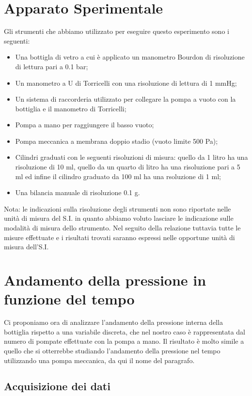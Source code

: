 \section{Apparato Sperimentale}

Gli strumenti che abbiamo utilizzato per eseguire questo esperimento sono i seguenti:
\begin{itemize}
	\item{Una bottigla di vetro a cui è applicato un manometro Bourdon di risoluzione di lettura pari a 0.1 bar;}
	\item{Un manometro a U di Torricelli con una risoluzione di lettura di 1 mmHg;}
	\item{Un sistema di raccorderia utilizzato per collegare la pompa a vuoto con la bottiglia e il manometro di Torricelli;}
	\item{Pompa a mano per raggiungere il basso vuoto;}
	\item{Pompa meccanica a membrana doppio stadio (vuoto limite 500 Pa);}
	\item{Cilindri graduati con le seguenti risoluzioni di misura: quello da 1 litro ha una risoluzione di 10 ml, quello da un quarto di litro ha una risoluzione pari a 5 ml ed infine il cilindro graduato da 100 ml ha una rsoluzione di 1 ml;}
	\item{Una bilancia manuale di risoluzione 0.1 g.}
\end{itemize}
%
Nota: %
le indicazioni sulla risoluzione degli strumenti non sono riportate nelle unità di misura del S.I. %
in quanto abbiamo voluto lasciare le indicazione sulle modalità di misura dello strumento. Nel seguito della relazione tuttavia tutte le misure effettuate e i risultati trovati saranno espressi nelle opportune unità di misura dell'S.I.

\section{Andamento della pressione in funzione del tempo}

Ci proponiamo ora di analizzare l'andamento della pressione interna della bottiglia rispetto a una
variabile discreta, che nel nostro caso è rappresentata dal numero di pompate effettuate
con la pompa a mano. Il risultato è molto simile a quello che si otterrebbe studiando l'andamento
della pressione nel tempo utilizzando una pompa meccanica, da qui il nome del paragrafo.

\subsection{Acquisizione dei dati}

